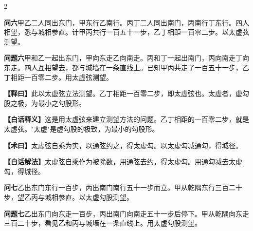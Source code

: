 \documentclass[11pt,a4paper]{article}
\newcommand{\WenQuestion}[1]{\textbf{\textcolor{classicalcolor}{#1}}}
\newcommand{\BaiQuestion}[1]{\textbf{\textcolor{moderncolor}{#1}}}
\newcommand{\WenExplain}{\textcolor{classicalcolor}{\textbf{【释曰】}}}
\newcommand{\BaiExplain}{\textcolor{moderncolor}{\textbf{【白话释义】}}}
\newcommand{\WenMethod}{\textcolor{classicalcolor}{\textbf{【术曰】}}}
\newcommand{\BaiMethod}{\textcolor{moderncolor}{\textbf{【白话解法】}}}
\begin{document}
\vspace{0.5em}

\begin{paracol}{2}

\switchcolumn*
\begin{tcolorbox}[colback=red!3,colframe=red!30!black,boxrule=0.3pt]
\WenQuestion{问六}\quad 甲乙二人同出东门，甲东行乙南行。丙丁二人同出南门，丙南行丁东行。四人相望，悉与城相参直。计甲丙共行一百五十一步，乙丁相距一百零二步。以太虚弦测望。
\end{tcolorbox}
\switchcolumn
\begin{tcolorbox}[colback=blue!3,colframe=blue!30!black,boxrule=0.3pt]
\BaiQuestion{问题六}\quad 甲和乙一起出东门，甲向东走乙向南走。丙和丁一起出南门，丙向南走丁向东走。四人互相望去，都与城墙在一条直线上。已知甲丙共走了一百五十一步，乙丁相距一百零二步。用太虚弦测望。
\end{tcolorbox}

\switchcolumn*
\begin{tcolorbox}[colback=red!5,colframe=red!30!black,boxrule=0.3pt]
\WenExplain\quad 此以太虚弦立法测望。乙丁相距一百零二步，即太虚弦也。太虚者，虚勾股之极，为最小之勾股形。
\end{tcolorbox}
\switchcolumn
\begin{tcolorbox}[colback=blue!5,colframe=blue!30!black,boxrule=0.3pt]
\BaiExplain\quad 这是用太虚弦来建立测望方法的问题。乙丁相距的一百零二步，就是太虚弦。"太虚"是虚勾股的极致，为最小的勾股形。
\end{tcolorbox}

\switchcolumn*
\begin{tcolorbox}[colback=red!5,colframe=red!40!black,boxrule=0.3pt]
\WenMethod\quad 太虚弦自乘为实，以通弦约之，得太虚勾。以太虚勾减通勾，得城径。
\end{tcolorbox}
\switchcolumn
\begin{tcolorbox}[colback=blue!5,colframe=blue!40!black,boxrule=0.3pt]
\BaiMethod\quad 太虚弦自乘作为被除数，用通弦去约，得太虚勾。用通勾减去太虚勾，得城径。
\end{tcolorbox}

\vspace{0.8em}

\switchcolumn*
\begin{tcolorbox}[colback=red!3,colframe=red!30!black,boxrule=0.3pt]
\WenQuestion{问七}\quad 乙出东门东行一百步，丙出南门南行五十一步而立。甲从乾隅东行三百二十步，望乙丙与城相参直。以太虚勾股测望。
\end{tcolorbox}
\switchcolumn
\begin{tcolorbox}[colback=blue!3,colframe=blue!30!black,boxrule=0.3pt]
\BaiQuestion{问题七}\quad 乙出东门向东走一百步，丙出南门向南走五十一步后停下。甲从乾隅向东走三百二十步，看见乙和丙与城墙在一条直线上。用太虚勾股测望。
\end{tcolorbox}


\end{paracol}
\end{document}
